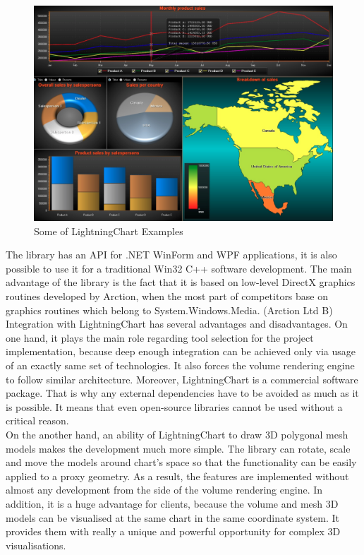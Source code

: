 \documentclass[twoside, english, 11pt]{report}
\begin{document}
\begin{figure}[!h]
\centerline{\includegraphics[scale=0.4]{img/chart}}
\caption{Some of LightningChart Examples}
\end{figure}

The library has an API for .NET WinForm and WPF applications, it is also possible to use it for a traditional Win32 C++ software development. The main advantage of the library is the fact that it is based on low-level DirectX graphics routines developed by Arction, when the most part of competitors base on graphics routines which belong to System.Windows.Media. (Arction Ltd B)\\

Integration with LightningChart has several advantages and disadvantages. On one hand, it plays the main role regarding tool selection for the project implementation, because deep enough integration can be achieved only via usage of an exactly same set of technologies. It also forces the volume rendering engine to follow similar architecture. Moreover, LightningChart is a commercial software package. That is why any external dependencies have to be avoided as much as it is possible. It means that even open-source libraries cannot be used without a critical reason.\\

On the another hand, an ability of LightningChart to draw 3D polygonal mesh models makes the development much more simple. The library can rotate, scale and move the models around chart's space so that the functionality can be easily applied to a proxy geometry. As a result, the features are implemented without almost any development from the side of the volume rendering engine. In addition, it is a huge advantage for clients, because the volume and mesh 3D models can be visualised at the same chart in the same coordinate system. It provides them with really a unique and powerful opportunity for complex 3D visualisations.
\end{document}
